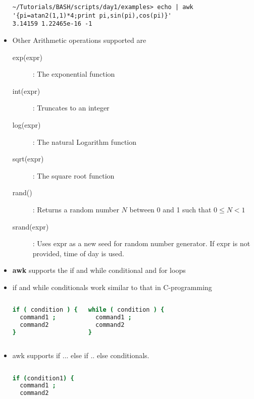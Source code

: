 \documentclass[10pt,t]{beamer}
\begin{document}
\begin{frame}
\begin{itemize}
    \begin{lstlisting}[style=LINUX]
~/Tutorials/BASH/scripts/day1/examples> echo | awk '{pi=atan2(1,1)*4;print pi,sin(pi),cos(pi)}'
3.14159 1.22465e-16 -1
    \end{lstlisting}
    \framebreak
    \item Other Arithmetic operations supported are
    \begin{description}
      \item[exp(expr)]: The exponential function
      \item[int(expr)]: Truncates to an integer
      \item[log(expr)]: The natural Logarithm function
      \item[sqrt(expr)]: The square root function
      \item[rand()]: Returns a random number $N$ between 0 and 1 such that $0\le N < 1$
      \item[srand(expr)]: Uses expr as a new seed for random number generator. If expr is not provided, time of day is used.
    \end{description}
    \item \textbf{awk} supports the if and while conditional and for loops
    \item if and while conditionals work similar to that in C-programming
    \begin{columns}
      \begin{exampleblock}{}
        \begin{lstlisting}[language=bash]
if ( condition ) {
  command1 ;
  command2
}
        \end{lstlisting}
      \end{exampleblock}
      \begin{exampleblock}{}
        \begin{lstlisting}[language=bash]
while ( condition ) {
  command1 ;
  command2
}
        \end{lstlisting}
      \end{exampleblock}
    \end{columns}
    \framebreak
    \item awk supports if ... else if .. else conditionals. 
    \begin{columns}
      \begin{exampleblock}{}
        \begin{lstlisting}[language=bash]
if (condition1) {
  command1 ;
  command2

\end{lstlisting}
\end{exampleblock}
\end{columns}
\end{itemize}
\end{frame}
\end{document}
